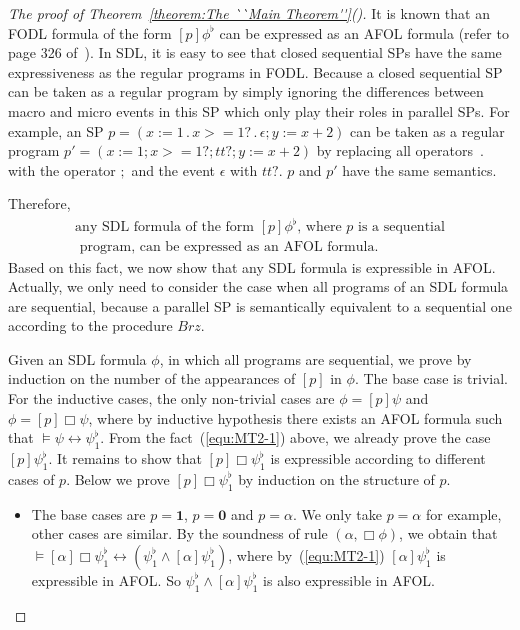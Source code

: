 \documentclass{fcs}
\newcommand{\rmn}[1]{(\romannumeral#1)}
\newcommand{\noth}[0]{\mathbf{1}}
\newcommand{\halt}[0]{\mathbf{0}}
\newcommand{\true}[0]{\mathit{tt}}
\DeclareMathOperator{\seq}{;}
\DeclareMathOperator{\nex}{.}
\newcommand{\ToSeq}[0]{\mathit{Brz}}
\begin{document}
\begin{proof}[The proof of Theorem~\ref{theorem:The ``Main Theorem''}\rmn{1}]
It is known that an FODL formula of the form $[p]\phi^\flat$ can be expressed as an AFOL formula (refer to page 326 of~\cite{Harel00}).
In SDL, it is easy to see that closed sequential SPs have the same expressiveness as the regular programs in FODL.
Because a closed sequential SP can be taken as a regular program by simply ignoring the differences between macro and micro events in this SP which only play their roles in parallel SPs.
For example, an SP $p= (x:=1\nex x>=1?\nex \epsilon \seq y:=x+2)$ can be taken as a regular program $p' = (x:=1\seq x>=1?\seq \true?\seq y:=x+2)$ by replacing all operators $\nex$ with the operator $\seq$ and the event $\epsilon$ with $\true?$.
$p$ and $p'$ have the same semantics.

Therefore,
\begin{equation}
\label{equ:MT2-1}
\begin{gathered}
\mbox{any SDL formula of the form $[p]\phi^\flat$, where $p$ is a sequential}\\
\mbox{ program, can be expressed as an AFOL formula. }
\end{gathered}
\end{equation}
Based on this fact, we now show that any SDL formula is expressible in AFOL.
Actually, we only need to consider the case when all programs of an SDL formula are sequential, because a parallel SP is semantically equivalent to a sequential one according to the procedure $\ToSeq$.

Given an SDL formula $\phi$, in which all programs are sequential, we prove by induction on the number of the appearances of $[p]$ in $\phi$. The base case is trivial.
For the inductive cases, the only non-trivial cases are $\phi = [p]\psi$ and $\phi = [p]\Box\psi$, where by inductive hypothesis there exists an AFOL formula such that $\models \psi \leftrightarrow \psi^\flat_1$.
From the fact~(\ref{equ:MT2-1}) above, we already prove the case $[p]\psi^\flat_1$.
It remains to show that $[p]\Box\psi^\flat_1$ is expressible according to different cases of $p$.
Below we prove $[p]\Box\psi^\flat_1$ by induction on the structure of $p$.

\begin{itemize}
\item The base cases are $p=\noth$, $p=\halt$ and $p=\alpha$.
We only take $p=\alpha$ for example, other cases are similar.
By the soundness of rule $(\alpha, \Box\phi)$, we obtain that $\models [\alpha]\Box\psi^\flat_1\leftrightarrow (\psi^\flat_1\wedge [\alpha]\psi^\flat_1)$, where by~(\ref{equ:MT2-1}) $[\alpha]\psi^\flat_1$ is expressible in AFOL.
So $\psi^\flat_1\wedge [\alpha]\psi^\flat_1$ is also expressible in AFOL.


\end{itemize}
\end{proof}
\end{document}
